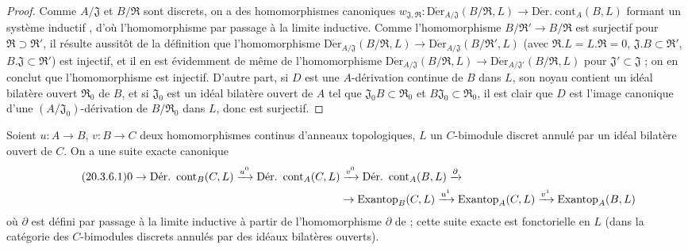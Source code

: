 \begin{proof}
Comme $A/\mathfrak{J}$ et $B/\mathfrak{R}$ sont discrets, on a des
homomorphismes canoniques
$w_{\mathfrak{J},\mathfrak{R}}:
\operatorname{D\acute{e}r}_{A/\mathfrak{J}}(B/\mathfrak{R},L)\to
\operatorname{D\acute{e}r.\ cont}_A(B,L)$ formant un système inductif
, d'où l'homomorphisme  par passage à
la limite inductive. Comme l'homomorphisme
$B/\mathfrak{R}'\to B/\mathfrak{R}$ est surjectif pour
$\mathfrak{R}\supset\mathfrak{R}'$, il résulte aussitôt de la définition que
l'homomorphisme
$\operatorname{D\acute{e}r}_{A/\mathfrak{J}}(B/\mathfrak{R},L)\to
\operatorname{D\acute{e}r}_{A/\mathfrak{J}}(B/\mathfrak{R}',L)$ (avec
$\mathfrak{R}.L=L.\mathfrak{R}=0$,
$\mathfrak{J}.B\subset\mathfrak{R}'$,
$B.\mathfrak{J}\subset\mathfrak{R}'$) est injectif, et il en est évidemment
de même de l'homomorphisme
$\operatorname{D\acute{e}r}_{A/\mathfrak{J}}(B/\mathfrak{R},L)\to
\operatorname{D\acute{e}r}_{A/\mathfrak{J}'}(B/\mathfrak{R},L)$ pour
$\mathfrak{J}'\subset\mathfrak{J}$  ; on en conclut que
l'homomorphisme  est injectif. D'autre part, si $D$ est
une $A$-dérivation continue de $B$ dans $L$, son noyau contient un idéal
bilatère ouvert $\mathfrak{R}_0$ de $B$, et si $\mathfrak{J}_0$ est un idéal
bilatère ouvert de $A$ tel que $\mathfrak{J}_0B\subset\mathfrak{R}_0$ et
$B\mathfrak{J}_0\subset\mathfrak{R}_0$, il est clair que $D$ est l'image
canonique d'une $(A/\mathfrak{J}_0)$-dérivation de
$B/\mathfrak{R}_0$ dans $L$, donc  est surjectif.
\end{proof}

\begin{proposition}[20.3.6]
\label{0.20.3.6-fr}
Soient $u:A\to B$, $v:B\to C$ deux homomorphismes continus d'anneaux
topologiques, $L$ un $C$-bimodule discret annulé par un idéal bilatère ouvert
de $C$. On a une suite exacte canonique
\begin{align}
\tag{20.3.6.1}
\label{0.20.3.6.1-fr}
  0\to\operatorname{D\acute{e}r.\ cont}_B(C,L)\xrightarrow{u^0}
  \operatorname{D\acute{e}r.\ cont}_A(C,L)&\xrightarrow{v^0}
  \operatorname{D\acute{e}r.\ cont}_A(B,L)\xrightarrow{\partial} \\
  &\to\operatorname{Exantop}_B(C,L)\xrightarrow{u^1}
  \operatorname{Exantop}_A(C,L)\xrightarrow{v^1}
  \operatorname{Exantop}_A(B,L) \notag
\end{align}
où $\partial$ est défini par passage à la limite inductive à partir de
l'homomorphisme $\partial$ de  ; cette suite exacte est
fonctorielle en $L$ (dans la catégorie des $C$-bimodules discrets annulés par
des idéaux bilatères ouverts).
\end{proposition}

